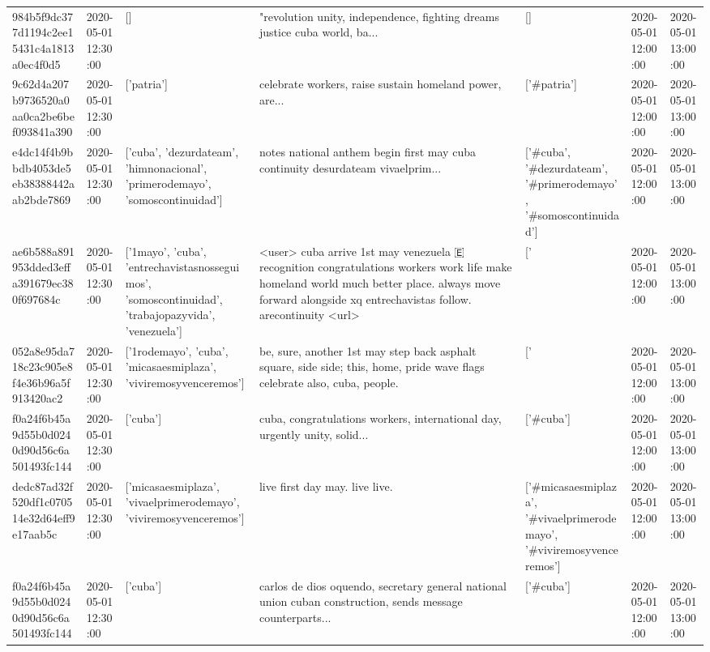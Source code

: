 \begin{tabular}{lllllll}
984b5f9dc377d1194c2ee15431c4a1813a0ec4f0d5 & 2020-05-01 12:30:00 & [] & "revolution unity, independence, fighting dreams justice cuba world, ba... & [] & 2020-05-01 12:00:00 & 2020-05-01 13:00:00 \\
9c62d4a207b9736520a0aa0ca2be6bef093841a390 & 2020-05-01 12:30:00 & ['patria'] & celebrate workers, raise sustain homeland power, are... & ['#patria'] & 2020-05-01 12:00:00 & 2020-05-01 13:00:00 \\
e4dc14f4b9bbdb4053de5eb38388442aab2bde7869 & 2020-05-01 12:30:00 & ['cuba', 'dezurdateam', 'himnonacional', 'primerodemayo', 'somoscontinuidad'] & notes national anthem begin first may cuba continuity desurdateam vivaelprim... & ['#cuba', '#dezurdateam', '#primerodemayo', '#somoscontinuidad'] & 2020-05-01 12:00:00 & 2020-05-01 13:00:00 \\
ae6b588a891953dded3effa391679ec380f697684c & 2020-05-01 12:30:00 & ['1mayo', 'cuba', 'entrechavistasnosseguimos', 'somoscontinuidad', 'trabajopazyvida', 'venezuela'] & <user> cuba arrive 1st may venezuela 🇪 recognition congratulations workers work life make homeland world much better place. always move forward alongside xq entrechavistas follow. arecontinuity <url> & ['#1mayo', '#cuba', '#somoscontinuidad', '#venezuela'] & 2020-05-01 12:00:00 & 2020-05-01 13:00:00 \\
052a8e95da718c23c905e8f4e36b96a5f913420ac2 & 2020-05-01 12:30:00 & ['1rodemayo', 'cuba', 'micasaesmiplaza', 'viviremosyvenceremos'] & be, sure, another 1st may step back asphalt square, side side; this, home, pride wave flags celebrate also, cuba, people. & ['#1rodemayo', '#cuba', '#micasaesmiplaza', '#viviremosyvenceremos'] & 2020-05-01 12:00:00 & 2020-05-01 13:00:00 \\
f0a24f6b45a9d55b0d0240d90d56c6a501493fc144 & 2020-05-01 12:30:00 & ['cuba'] & cuba, congratulations workers, international day, urgently unity, solid... & ['#cuba'] & 2020-05-01 12:00:00 & 2020-05-01 13:00:00 \\
dedc87ad32f520df1c070514e32d64eff9e17aab5c & 2020-05-01 12:30:00 & ['micasaesmiplaza', 'vivaelprimerodemayo', 'viviremosyvenceremos'] & live first day may. live live. & ['#micasaesmiplaza', '#vivaelprimerodemayo', '#viviremosyvenceremos'] & 2020-05-01 12:00:00 & 2020-05-01 13:00:00 \\
f0a24f6b45a9d55b0d0240d90d56c6a501493fc144 & 2020-05-01 12:30:00 & ['cuba'] & carlos de dios oquendo, secretary general national union cuban construction, sends message counterparts... & ['#cuba'] & 2020-05-01 12:00:00 & 2020-05-01 13:00:00 \\

\end{tabular}
